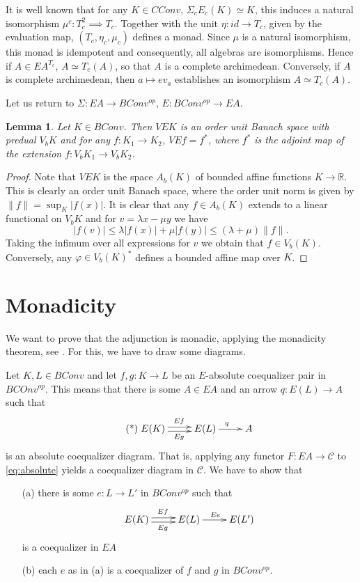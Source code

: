 \documentclass[12pt]{article}
\newtheorem{lemma}{Lemma}
\newcommand{\<}{\langle}
\begin{document}
It is well known that for any $K\in CConv$, $\Sigma_cE_c(K)\simeq K$, this induces a natural isomorphism $\mu^c:T_c^2\implies T_c$. Together with the unit $\eta: id\to T_c$, given by the evaluation map, $(T_c,\eta_c,\mu_c)$ defines a monad. Since $\mu$ is a natural isomorphism, this monad is idempotent and consequently, all algebras are isomorphisms. Hence if
$A\in EA^{T_c}$, $A\simeq T_c(A)$, so that $A$ is a complete archimedean. Conversely, if $A$ is complete archimedean, 
 then $a\mapsto ev_a$ establishes an isomorphism $A\simeq T_c(A)$. 


Let us return to  $\Sigma: EA\to BConv^{op}$, $E:BConv^{op}\to EA$.

\begin{lemma}\label{lemma:bas} Let $K\in BConv$. Then $VEK$ is an order unit Banach space with predual $V_bK$ and for any $f: K_1\to K_2$,
 $VEf=f^*$, where $f^*$ is the adjoint map of the extension  $f: V_bK_1\to V_bK_2$.

\end{lemma}

\begin{proof} Note that $VEK$ is the space $A_b(K)$ of bounded affine functions $K\to \mathbb R$. This is clearly an order unit Banach space, where the order unit norm is given by $\|f\|=\sup_K|f(x)|$. It is clear that any $f\in A_b(K)$ 
extends to a linear functional on $V_bK$ and for $v=\lambda x-\mu y$ we have
\[
|f(v)|\le \lambda|f(x)|+\mu|f(y)|\le (\lambda+\mu)\|f\|.
\]
Taking the infimum over all expressions for $v$ we obtain that $f\in V_b(K)$. Conversely, any $\varphi\in V_b(K)^*$ defines a 
 bounded affine map over $K$.

\end{proof}

\section{Monadicity}

We want to prove that the adjunction is monadic, applying the monadicity theorem, see \cite{leinster}. For this, we have to draw some diagrams.

Let $K,L\in BConv$ and let $f,g:K\to L$ be an $E$-absolute coequalizer pair in $BCOnv^{op}$. This means that there is some $A\in EA$ and an arrow $q:E(L)\to A$ such that
\begin{equation}\label{eq:absolute}\tag{*}
\xymatrix{
E(K) \ar@<.5ex>[r]^{Ef} \ar@<-.5ex>[r]_{Eg} &E(L)\ar[r]^q & A}
\end{equation}
is an absolute coequalizer diagram. That is, applying any functor $F: EA\to \mathcal C$ to \eqref{eq:absolute} yields a coequalizer diagram in $\mathcal C$. We have to show that
\begin{enumerate}
\item[(a)] there is some $e: L\to L'$ in $BConv^{op}$ such that 
\begin{equation}
\xymatrix{
E(K) \ar@<.5ex>[r]^{Ef} \ar@<-.5ex>[r]_{Eg} &E(L)\ar[r]^{Ee} & E(L')}
\end{equation}
is a coequalizer in $EA$
\item[(b)] each $e$ as in (a) is a coequalizer of $f$ and $g$ in $BConv^{op}$.
\end{enumerate}
\end{document}
